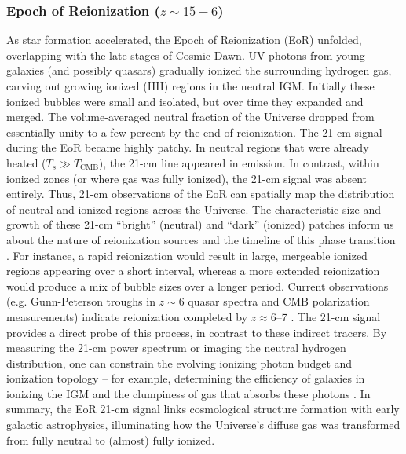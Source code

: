 \documentclass[floats,floatfix,showpacs,amssymb,prd,superscriptaddress,nofootinbib, 11pt]{revtex4-2} %
\begin{document}
\subsubsection{Epoch of Reionization ($z \sim 15-6$)}
As star formation accelerated, the Epoch of Reionization (EoR) unfolded, overlapping with the late stages of Cosmic Dawn. UV photons from young galaxies (and possibly quasars) gradually ionized the surrounding hydrogen gas, carving out growing ionized (HII) regions in the neutral IGM. Initially these ionized bubbles were small and isolated, but over time they expanded and merged. The volume-averaged neutral fraction of the Universe dropped from essentially unity to a few percent by the end of reionization. The 21-cm signal during the EoR became highly patchy. In neutral regions that were already heated ($T_s \gg T_{\text{CMB}}$), the 21-cm line appeared in emission. In contrast, within ionized zones (or where gas was fully ionized), the 21-cm signal was absent entirely. Thus, 21-cm observations of the EoR can spatially map the distribution of neutral and ionized regions across the Universe. The characteristic size and growth of these 21-cm “bright” (neutral) and “dark” (ionized) patches inform us about the nature of reionization sources and the timeline of this phase transition \citep{McQuinn_2007, Friedrich_2011}. For instance, a rapid reionization would result in large, mergeable ionized regions appearing over a short interval, whereas a more extended reionization would produce a mix of bubble sizes over a longer period. Current observations (e.g. Gunn-Peterson troughs in $z\sim6$ quasar spectra and CMB polarization measurements) indicate reionization completed by $z\approx6$–7 \citep{Fan_2006, Planck2015results}. The 21-cm signal provides a direct probe of this process, in contrast to these indirect tracers. By measuring the 21-cm power spectrum or imaging the neutral hydrogen distribution, one can constrain the evolving ionizing photon budget and ionization topology – for example, determining the efficiency of galaxies in ionizing the IGM and the clumpiness of gas that absorbs these photons \citep{Robertson_2010, Greig_Mesinger_2017}.
In summary, the EoR 21-cm signal links cosmological structure formation with early galactic astrophysics, illuminating how the Universe’s diffuse gas was transformed from fully neutral to (almost) fully ionized.
\end{document}
